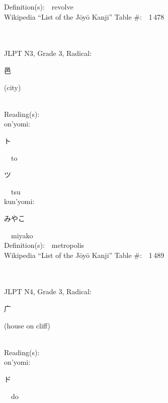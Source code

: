 \begin{multicols}{2}
Definition(s):\ \ revolve \\
Wikipedia ``List of the J\=oy\=o Kanji'' Table \#:\ \ 1\,478 \\
\ \ \\
{\fontsize{34pt}{40pt}  }\ \ \\  %
{JLPT N3, Grade 3, Radical:\ \ {\begin{CJK}{UTF8}{min} 邑 \end{CJK}} (city) } \\
Reading(s):\ \ \\
{\hspace*{1em}}on'yomi:\ \ \\
{\hspace*{2em}}{\begin{CJK}{UTF8}{min} ト \end{CJK}}\ \ to\ \ \\
{\hspace*{2em}}{\begin{CJK}{UTF8}{min} ツ \end{CJK}}\ \ tsu\ \ \\
{\hspace*{1em}}kun'yomi:\ \ \\
{\hspace*{2em}}{\begin{CJK}{UTF8}{min} みやこ \end{CJK}}\ \ miyako\ \ \\
Definition(s):\ \ metropolis \\
Wikipedia ``List of the J\=oy\=o Kanji'' Table \#:\ \ 1\,489 \\
\ \ \\
{\fontsize{34pt}{40pt}  }\ \ \\  %
{JLPT N4, Grade 3, Radical:\ \ {\begin{CJK}{UTF8}{min} 广 \end{CJK}} (house on cliff) } \\
Reading(s):\ \ \\
{\hspace*{1em}}on'yomi:\ \ \\
{\hspace*{2em}}{\begin{CJK}{UTF8}{min} ド \end{CJK}}\ \ do\ \ \\

\end{multicols}
